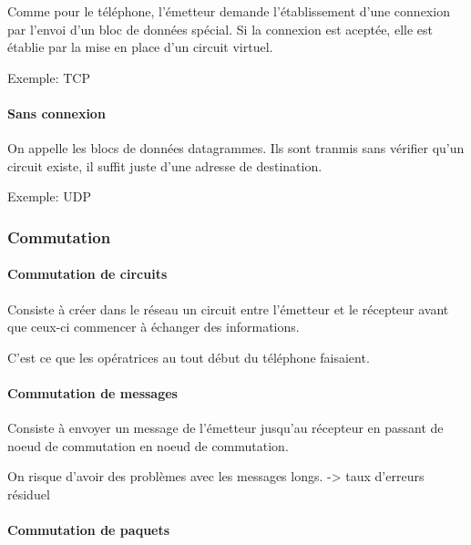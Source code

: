 Comme pour le téléphone, l'émetteur demande l'établissement d'une
connexion par l'envoi d'un bloc de données spécial. Si la connexion est
aceptée, elle est établie par la mise en place d'un circuit virtuel.

Exemple: TCP

\hypertarget{sans-connexion}{%
\paragraph{Sans connexion}\label{sans-connexion}}

On appelle les blocs de données datagrammes. Ils sont tranmis sans
vérifier qu'un circuit existe, il suffit juste d'une adresse de
destination.

Exemple: UDP

\hypertarget{commutation}{%
\subsubsection{Commutation}\label{commutation}}

\hypertarget{commutation-de-circuits}{%
\paragraph{Commutation de circuits}\label{commutation-de-circuits}}

Consiste à créer dans le réseau un circuit entre l'émetteur et le
récepteur avant que ceux-ci commencer à échanger des informations.

C'est ce que les opératrices au tout début du téléphone faisaient.

\hypertarget{commutation-de-messages}{%
\paragraph{Commutation de messages}\label{commutation-de-messages}}

Consiste à envoyer un message de l'émetteur jusqu'au récepteur en
passant de noeud de commutation en noeud de commutation.

On risque d'avoir des problèmes avec les messages longs. -\textgreater{}
taux d'erreurs résiduel

\hypertarget{commutation-de-paquets}{%
\paragraph{Commutation de paquets}\label{commutation-de-paquets}}


